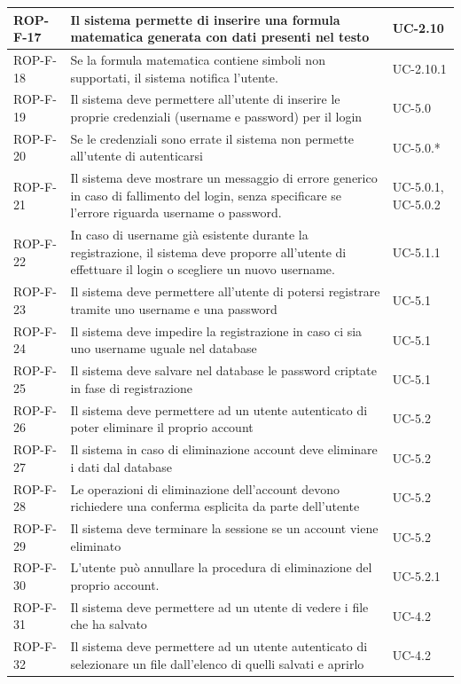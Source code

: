 \documentclass[11pt,a4paper]{article}
\begin{document}
\begin{longtable}{|p{}|>{\raggedright\arraybackslash}p{}|p{}|}
\hline
ROP-F-17 & Il sistema permette di inserire una formula matematica generata con dati presenti nel testo & UC-2.10 \\
\hline
ROP-F-18 & Se la formula matematica contiene simboli non supportati, il sistema notifica l'utente. & UC-2.10.1 \\
\hline
ROP-F-19 & Il sistema deve permettere all'utente di inserire le proprie credenziali (username e password) per il login & UC-5.0 \\
\hline
ROP-F-20 & Se le credenziali sono errate il sistema non permette all'utente di autenticarsi & UC-5.0.* \\
\hline
ROP-F-21 & Il sistema deve mostrare un messaggio di errore generico in caso di fallimento del login, senza specificare se l'errore riguarda username o password. & UC-5.0.1, UC-5.0.2 \\
\hline
ROP-F-22 & In caso di username già esistente durante la registrazione, il sistema deve proporre all'utente di effettuare il login o scegliere un nuovo username. & UC-5.1.1 \\
\hline
ROP-F-23 & Il sistema deve permettere all'utente di potersi registrare tramite uno username e una password & UC-5.1 \\
\hline
ROP-F-24 & Il sistema deve impedire la registrazione in caso ci sia uno username uguale nel database & UC-5.1 \\
\hline
ROP-F-25 & Il sistema deve salvare nel database le password criptate in fase di registrazione & UC-5.1 \\
\hline
ROP-F-26 & Il sistema deve permettere ad un utente autenticato di poter eliminare il proprio account & UC-5.2 \\
\hline
ROP-F-27 & Il sistema in caso di eliminazione account deve eliminare i dati dal database & UC-5.2 \\
\hline
ROP-F-28 & Le operazioni di eliminazione dell'account devono richiedere una conferma esplicita da parte dell'utente & UC-5.2 \\
\hline
ROP-F-29 & Il sistema deve terminare la sessione se un account viene eliminato & UC-5.2 \\
\hline
ROP-F-30 & L'utente può annullare la procedura di eliminazione del proprio account. & UC-5.2.1 \\
\hline
ROP-F-31 & Il sistema deve permettere ad un utente di vedere i file che ha salvato & UC-4.2 \\
\hline
ROP-F-32 & Il sistema deve permettere ad un utente autenticato di selezionare un file dall'elenco di quelli salvati e aprirlo & UC-4.2 \\

\end{longtable}
\end{document}
